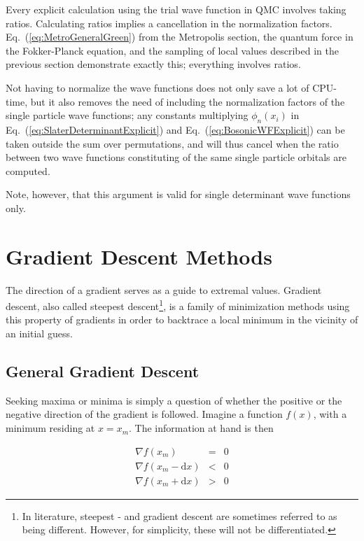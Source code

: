 Every explicit calculation using the trial wave function in QMC involves taking ratios. Calculating ratios implies a cancellation in the normalization factors. Eq.~(\ref{eq:MetroGeneralGreen}) from the Metropolis section, the quantum force in the Fokker-Planck equation, and the sampling of local values described in the previous section demonstrate exactly this; everything involves ratios.

Not having to normalize the wave functions does not only save a lot of CPU-time, but it also removes the need of including the normalization factors of the single particle wave functions; any constants multiplying $\phi_n(x_i)$ in Eq.~(\ref{eq:SlaterDeterminantExplicit}) and Eq.~(\ref{eq:BosonicWFExplicit}) can be taken outside the sum over permutations, and will thus cancel when the ratio between two wave functions constituting of the same single particle orbitals are computed. 

Note, however, that this argument is valid for single determinant wave functions only. 

\section{Gradient Descent Methods}
\label{sec:GradientDescent}

The direction of a gradient serves as a guide to extremal values. Gradient descent, also called steepest descent\footnote{In literature, steepest - and gradient descent are sometimes referred to as being different. However, for simplicity, these will not be differentiated.}, is a family of minimization methods using this property of gradients in order to backtrace a local minimum in the vicinity of an initial guess. 

\subsection{General Gradient Descent}

Seeking maxima or minima is simply a question of whether the positive or the negative direction of the gradient is followed.
Imagine a function $f(x)$, with a minimum residing at $x=x_m$. The information at hand is then

\begin{eqnarray}
 \nabla f(x_m) &=& 0 \\
 \nabla f(x_m - \mathrm{d}x) &<& 0 \\
  \nabla f(x_m + \mathrm{d}x) &>& 0
\end{eqnarray}

